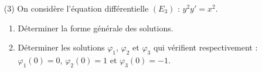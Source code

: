 
\begin{exercice}\label{exoautoanalyseCTU-32devoir}


\begin{enumerate}
\item[(3)] On considère l'équation différentielle $(E_{3})$ : $y^2y'=x^2$. 
\begin{enumerate}
\item Déterminer la forme générale des solutions.
\item Déterminer les solutions $\varphi_{1}$, $\varphi_{2}$ et $\varphi_{3}$ qui vérifient respectivement : $\varphi_{1}(0)=0$, $\varphi_{2}(0)=1$ et $\varphi_{3}(0)=-1$. 
 \end{enumerate}
\end{enumerate}




\end{exercice}
